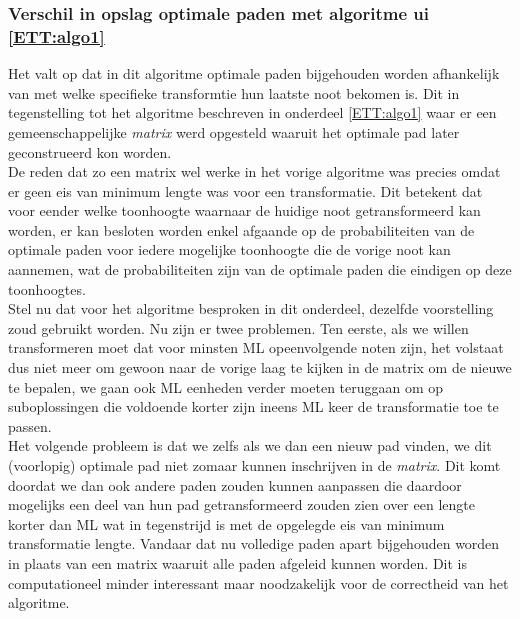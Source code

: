 \subsubsection{Verschil in opslag optimale paden met algoritme ui \ref{ETT:algo1}}
Het valt op dat in dit algoritme optimale paden bijgehouden worden afhankelijk van met welke specifieke transformtie hun laatste noot bekomen is. Dit in tegenstelling tot het algoritme beschreven in onderdeel \ref{ETT:algo1} waar er een gemeenschappelijke \textit{matrix} werd opgesteld waaruit het optimale pad later geconstrueerd kon worden.\\ 
De reden dat zo een matrix wel werke in het vorige algoritme was precies omdat er geen eis van minimum lengte was voor een transformatie. Dit betekent dat voor eender welke toonhoogte waarnaar de huidige noot getransformeerd kan worden, er kan besloten worden enkel afgaande op de probabiliteiten van de optimale paden voor iedere mogelijke toonhoogte die de vorige noot kan aannemen, wat de probabiliteiten zijn van de optimale paden die eindigen op deze toonhoogtes.\\ 
Stel nu dat voor het algoritme besproken in dit onderdeel, dezelfde voorstelling zoud gebruikt worden. Nu zijn er twee problemen. Ten eerste, als we willen transformeren moet dat voor minsten ML opeenvolgende noten zijn, het volstaat dus niet meer om gewoon naar de vorige laag te kijken in de matrix om de nieuwe te bepalen, we gaan ook ML eenheden verder moeten teruggaan om op suboplossingen die voldoende korter zijn ineens ML keer de transformatie toe te passen.\\ 
Het volgende probleem is dat we zelfs als we dan een nieuw pad vinden, we dit (voorlopig) optimale pad niet zomaar kunnen inschrijven in de \textit{matrix}. Dit komt doordat we dan ook andere paden zouden kunnen aanpassen die daardoor mogelijks een deel van hun pad getransformeerd zouden zien over een lengte korter dan ML wat in tegenstrijd is met de opgelegde eis van minimum transformatie lengte. Vandaar dat nu volledige paden apart bijgehouden worden in plaats van een matrix waaruit alle paden afgeleid kunnen worden. Dit is computationeel minder interessant maar noodzakelijk voor de correctheid van het algoritme.

